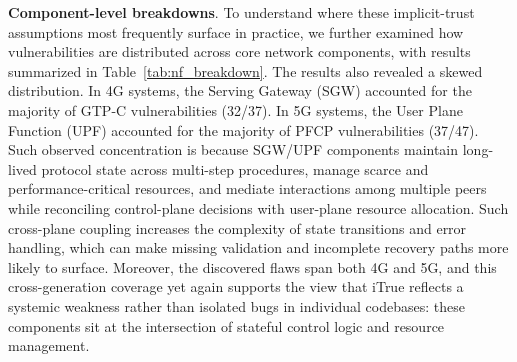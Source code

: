 \begin{table}[!t]
  \centering
  \caption{Vulnerability breakdown by CN components.}
  \label{tab:nf_breakdown}
\end{table}

\vspace{2pt}\noindent\textbf{Component-level breakdowns}. To understand where these implicit-trust assumptions most frequently surface in practice, we further examined how vulnerabilities are distributed across core network components, with results summarized in Table~\ref{tab:nf_breakdown}.
The results also revealed a skewed distribution. In 4G systems, the Serving Gateway (SGW) accounted for the majority of GTP-C vulnerabilities (32/37). In 5G systems, the User Plane Function (UPF) accounted for the majority of PFCP vulnerabilities (37/47).
Such observed concentration is because SGW/UPF components maintain long-lived protocol state across multi-step procedures, manage scarce and performance-critical resources, and mediate interactions among multiple peers while reconciling control-plane decisions with user-plane resource allocation. Such cross-plane coupling increases the complexity of state transitions and error handling, which can make missing validation and incomplete recovery paths more likely to surface.
Moreover, the discovered flaws span both 4G and 5G, and this cross-generation coverage yet again supports the view that iTrue reflects a systemic weakness rather than isolated bugs in individual codebases: these components sit at the intersection of stateful control logic and resource management.





















